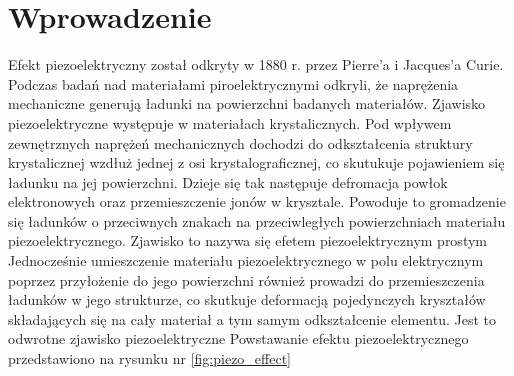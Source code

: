 \chapter{Wprowadzenie}
\label{sec:introduction}

Efekt piezoelektryczny został odkryty w 1880 r. przez Pierre’a i Jacques’a Curie. 
Podczas badań nad materiałami piroelektrycznymi odkryli, że naprężenia mechaniczne
generują ładunki na powierzchni badanych materiałów. Zjawisko piezoelektryczne 
występuje w materiałach krystalicznych. Pod wpływem zewnętrznych naprężeń mechanicznych 
dochodzi do odkształcenia struktury krystalicznej wzdłuż jednej z osi krystalograficznej, 
co skutukuje pojawieniem się ładunku na jej powierzchni. Dzieje się tak 
następuje defromacja powłok elektronowych oraz przemieszczenie jonów w krysztale.
Powoduje to gromadzenie się ładunków o przeciwnych znakach na przeciwległych
powierzchniach materiału piezoelektrycznego. Zjawisko to nazywa się efetem 
piezoelektrycznym prostym \cite{pvdf_exp}
Jednocześnie 
umieszczenie materiału piezoelektrycznego w polu elektrycznym poprzez przyłożenie 
do jego powierzchni również prowadzi do przemieszczenia ładunków w jego strukturze, 
co skutkuje deformacją pojedynczych kryształów składających się na cały materiał a tym 
samym odkształcenie elementu. Jest to odwrotne zjawisko piezoelektryczne \cite{pvdf_exp}
Powstawanie efektu piezoelektrycznego przedstawiono na rysunku nr \ref{fig:piezo_effect}

